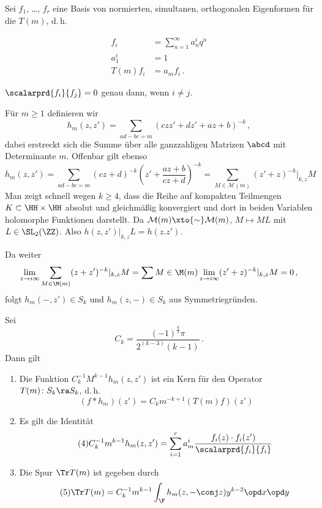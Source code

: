 Sei $f_1$, \ldots, $f_r$ eine Basis von normierten, simultanen, orthogonalen Eigenformen für die $T(m)$, d.\,h.

\begin{align*}
	f_i &= \sum_{n=1}^\infty a_n^i q^n \\
	a_1^i &= 1 \\
	T(m)f_i &= a_mf_i
	\,.
\end{align*}

\begin{erin}
	$\scalarprd {f_i}{f_j} = 0$ genau dann, wenn $i \not= j$.
\end{erin}

Für $m \geq 1$ definieren wir
\[
	h_m(z, z') = \sum_{ad-bc=m} (czz' + dz' + az + b)^{-k}
	\,,
\]
dabei erstreckt sich die Summe über alle ganzzahligen Matrizen $\abcd$ mit Determinante $m$.
Offenbar gilt ebenso
\[
	h_m(z,z') = \sum_{ad-bc=m} (cz+d)^{-k} (z' + \frac{az+b}{cz+d})^{-k}
	= \sum_{M \in \mathcal{M}(m)} (z'+z)^{-k}|_{k,z} M
\]
Man zeigt schnell wegen $k \geq 4$, dass die Reihe auf kompakten Teilmengen $K \subset \HH \times \HH$ absolut und gleichmäßig konvergiert und dort in beiden Variablen holomorphe Funktionen darstellt.
Da $\mathcal{M}(m) \xto{\sim} \mathcal{M}(m)$, $M \mapsto ML$ mit $L \in \SL_2(\ZZ)$.
Also $h(z,z')|_{k,z} L = h(z. z')$.

Da weiter
\begin{align*}
	\lim_{z \to i\infty} \sum_{M \in \M(m)} (z+z')^{-k}|_{k,z} M
	= \sum{M \in \M(m)} \lim_{z \to i\infty} (z'+z)^{-k}|_{k,z} M
	= 0\,,
\end{align*}
folgt $h_m(-, z') \in S_k$ und $h_m(z, -) \in S_k$ aus Symmetriegründen.
\begin{satz}
	Sei
	\[\tag{2}
		C_k = \frac{(-1)^{\frac{k}{2}} \pi}{2^{(k-3)}(k-1)}\,.
	\]
	Dann gilt
	\begin{enumerate}
		\item Die Funktion $C_k^{-1} M^{k-1} h_m(z,z')$ ist ein Kern für den Operator $T(m)\colon S_k \ra S_k$, d.\,h.
		\[\tag{3}
			(f * h_m)(z') = C_km^{-k+1} (T(m)f)(z')
		\]
		\item Es gilt die Identität 
		\[\tag{4}
			C_k^{-1} m^{k-1} h_m(z,z') = \sum_{i=1}^r a_m^i \frac{f_i(z) \cdot f_i(z')}{\scalarprd{f_i}{f_i}}
		\]
		\item Die Spur $\Tr T(m)$ ist gegeben durch
		\[\tag{5}
			\Tr T(m) = C_k^{-1} m^{k-1} \int_\F h_m(z, -\conj z) y^{k-2} \opd x \opd y
		\]
	\end{enumerate}
\end{satz}

